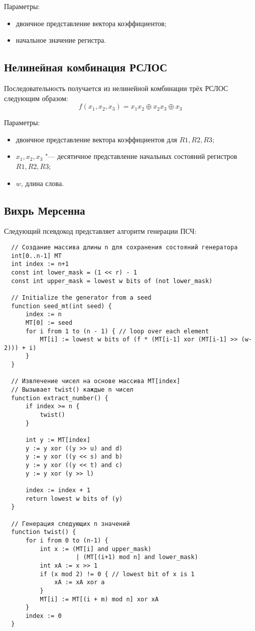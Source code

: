 \documentclass[bachelor, och, pract_otchet]{SCWorks}
\begin{document}
Параметры:
\begin{itemize}
  \item двоичное представление вектора коэффициентов;
  \item начальное значение регистра.
\end{itemize}

\subsection{Нелинейная комбинация РСЛОС}
Последовательность получается из нелинейной комбинации трёх РСЛОС следующим образом:
\[ f(x_1, x_2, x_3) = x_1 x_2 \oplus x_2 x_3 \oplus x_3 \]

Параметры:
\begin{itemize}
  \item двоичное представление вектора коэффициентов для $R1, R2, R3$;
  \item $x_1, x_2, x_3$ "--- десятичное представление начальных состояний регистров $R1, R2, R3$;
  \item $w$, длина слова.
\end{itemize}

\subsection{Вихрь Мерсенна}
Следующий псевдокод представляет алгоритм генерации ПСЧ:
\begin{verbatim}
  // Создание массива длины n для сохранения состояний генератора
  int[0..n-1] MT
  int index := n+1
  const int lower_mask = (1 << r) - 1
  const int upper_mask = lowest w bits of (not lower_mask)
  
  // Initialize the generator from a seed
  function seed_mt(int seed) {
      index := n
      MT[0] := seed
      for i from 1 to (n - 1) { // loop over each element
          MT[i] := lowest w bits of (f * (MT[i-1] xor (MT[i-1] >> (w-2))) + i)
      }
  }
  
  // Извлечение чисел на основе массива MT[index]
  // Вызывает twist() каждые n чисел
  function extract_number() {
      if index >= n {
          twist()
      }
  
      int y := MT[index]
      y := y xor ((y >> u) and d)
      y := y xor ((y << s) and b)
      y := y xor ((y << t) and c)
      y := y xor (y >> l)
  
      index := index + 1
      return lowest w bits of (y)
  }
  
  // Генерация следующих n значений
  function twist() {
      for i from 0 to (n-1) {
          int x := (MT[i] and upper_mask)
                    | (MT[(i+1) mod n] and lower_mask)
          int xA := x >> 1
          if (x mod 2) != 0 { // lowest bit of x is 1
              xA := xA xor a
          }
          MT[i] := MT[(i + m) mod n] xor xA
      }
      index := 0
  }  
\end{verbatim}
\end{document}
